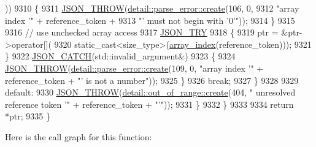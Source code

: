\begin{DoxyCode}
      ))
9310                     \{
9311                         \hyperlink{json_8hpp_a6c274f6db2e65c1b66c7d41b06ad690f}{JSON\_THROW}(\hyperlink{classnlohmann_1_1detail_1_1parse__error_a9fd60ad6bce80fd99686ad332faefd37}{detail::parse\_error::create}(106, 0,
9312                                                                \textcolor{stringliteral}{"array index '"} + reference\_token +
9313                                                                \textcolor{stringliteral}{"' must not begin with '0'"}));
9314                     \}
9315 
9316                     \textcolor{comment}{// use unchecked array access}
9317                     \hyperlink{json_8hpp_a985d3b82445302c57257f6432f261fe9}{JSON\_TRY}
9318                     \{
9319                         ptr = &ptr->operator[](
9320                             \textcolor{keyword}{static\_cast<}size\_type\textcolor{keyword}{>}(\hyperlink{classnlohmann_1_1json__pointer_ac53f5b79dd91da78743c437832f57ce4}{array\_index}(reference\_token)));
9321                     \}
9322                     \hyperlink{json_8hpp_a6954bec49ed2a2dfb938c1131c82740a}{JSON\_CATCH}(std::invalid\_argument&)
9323                     \{
9324                         \hyperlink{json_8hpp_a6c274f6db2e65c1b66c7d41b06ad690f}{JSON\_THROW}(\hyperlink{classnlohmann_1_1detail_1_1parse__error_a9fd60ad6bce80fd99686ad332faefd37}{detail::parse\_error::create}(109, 0,
       \textcolor{stringliteral}{"array index '"} + reference\_token + \textcolor{stringliteral}{"' is not a number"}));
9325                     \}
9326                     \textcolor{keywordflow}{break};
9327                 \}
9328 
9329                 \textcolor{keywordflow}{default}:
9330                     \hyperlink{json_8hpp_a6c274f6db2e65c1b66c7d41b06ad690f}{JSON\_THROW}(\hyperlink{classnlohmann_1_1detail_1_1out__of__range_a3f6d82a6f967c4728a1ec735a7867073}{detail::out\_of\_range::create}(404, \textcolor{stringliteral}{"
      unresolved reference token '"} + reference\_token + \textcolor{stringliteral}{"'"}));
9331             \}
9332         \}
9333 
9334         \textcolor{keywordflow}{return} *ptr;
9335     \}
\end{DoxyCode}
Here is the call graph for this function\+:
\mbox{\label{classnlohmann_1_1json__pointer_aa7cd421aaccabea7ffcf953f7ff96362}} 
